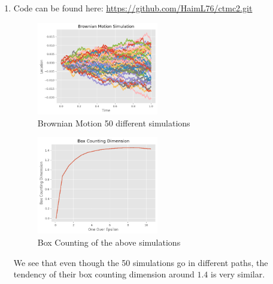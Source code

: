 \documentclass{article}
\begin{document}
\begin{enumerate}
\item Code can be found here: \url{https://github.com/HaimL76/ctmc2.git}

\begin{figure}[h]
\caption{Brownian Motion 50 different simulations}
\centering
\includegraphics[width=0.5\textwidth]{brownian_motion_simulation.png}
\end{figure}
\begin{figure}[h]
\caption{Box Counting of the above simulations}
\centering
\includegraphics[width=0.5\textwidth]{box_counting_dimensions.png}
\end{figure}
We see that even though the 50 simulations go in different paths, the tendency of their box counting dimension around $1.4$ is very similar.


\end{enumerate}
\end{document}
